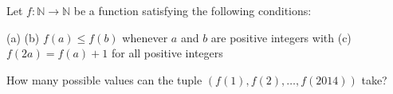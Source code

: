 Let $f:\mathbb{N}\to\mathbb{N}$ be a function satisfying the following conditions:

(a) 
(b) $f(a)\leq f(b)$ whenever $a$ and $b$ are positive integers with 
(c) $f(2a)=f(a)+1$ for all positive integers 

How many possible values can the tuple $(f(1),f(2),\ldots,f(2014))$ take?